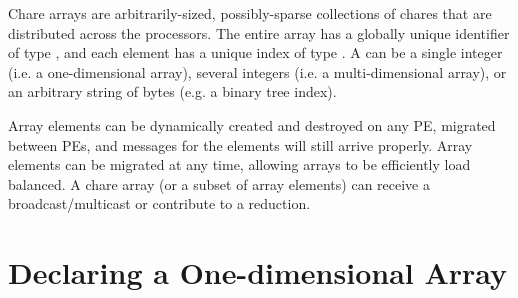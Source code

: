 \label{basic arrays}

Chare arrays are
arbitrarily-sized, possibly-sparse collections of chares that are distributed
across the processors. The entire array has a globally unique identifier of
type , and each element has a unique index of type
. A  can be a single integer (i.e. a one-dimensional array),
several integers (i.e. a multi-dimensional array), or an arbitrary string of
bytes (e.g. a binary tree index).

Array elements can be dynamically created and destroyed on any PE,
migrated between PEs, and messages for the elements will still arrive
properly. Array elements can be migrated at any time, allowing arrays to be
efficiently load balanced. A chare array (or a subset of array elements) can
receive a broadcast/multicast or contribute to a reduction.

\section{Declaring a One-dimensional Array}

